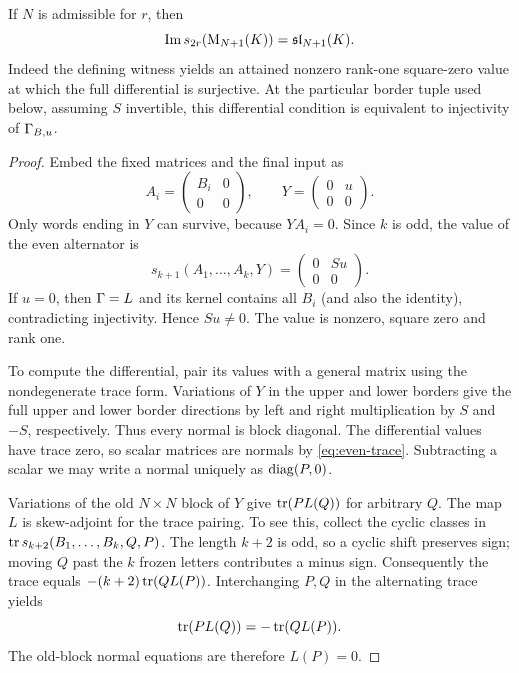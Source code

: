 \begin{lemma}\label{lem:core-normal}
If $N$ is admissible for $r$, then
\begin{equation}\label{eq:core-conclusion}
 \operatorname{Im} s_{2r}(\mathrm{M}_{N+1}(K))=\mathfrak{sl}_{N+1}(K).
\end{equation}
Indeed the defining witness yields an attained nonzero rank-one
square-zero value at which the full differential is surjective.
At the particular border tuple used below, assuming $S$ invertible,
this differential condition is equivalent to injectivity of
$\Gamma_{B,u}$.
\end{lemma}
\begin{proof}
Embed the fixed matrices and the final input as
\begin{equation}\label{eq:core-border}
 A_i=\begin{pmatrix}B_i&0\\0&0\end{pmatrix},\qquad
 Y=\begin{pmatrix}0&u\\0&0\end{pmatrix}.
\end{equation}
Only words ending in $Y$ can survive, because $YA_i=0$.
Since $k$ is odd, the value of the even alternator is
\begin{equation}\label{eq:core-border-value}
 s_{k+1}(A_1,\ldots,A_k,Y)
 =\begin{pmatrix}0&Su\\0&0\end{pmatrix}.
\end{equation}
If $u=0$, then $\Gamma=L$ and its kernel contains all
$B_i$ (and also the identity), contradicting injectivity.
Hence $Su\ne0$. The value is nonzero, square zero and rank one.

To compute the differential, pair its values with a general
matrix using the nondegenerate trace form. Variations of $Y$
in the upper and lower borders give the full upper and lower
border directions by left and right multiplication by $S$ and
$-S$, respectively. Thus every normal is block diagonal.
The differential values have trace zero, so scalar matrices
are normals by \eqref{eq:even-trace}. Subtracting a scalar we
may write a normal uniquely as $\operatorname{diag}(P,0)$.

Variations of the old $N\times N$ block of $Y$ give
$\operatorname{tr}(P L(Q))$ for arbitrary $Q$. The map $L$ is
skew-adjoint for the trace pairing. To see this, collect the
cyclic classes in
$\operatorname{tr} s_{k+2}(B_1,\ldots,B_k,Q,P)$. The length
$k+2$ is odd, so a cyclic shift preserves sign; moving $Q$
past the $k$ frozen letters contributes a minus sign.
Consequently the trace equals $-(k+2)\operatorname{tr}(Q L(P))$.
Interchanging $P,Q$ in the alternating trace yields
\begin{equation}\label{eq:core-skew}
 \operatorname{tr}(P L(Q))=-\operatorname{tr}(Q L(P)).
\end{equation}
The old-block normal equations are therefore $L(P)=0$.


\end{proof}
